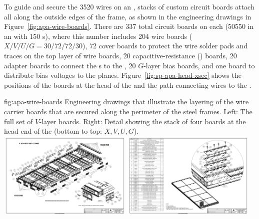 To guide and secure the \num{3520} wires on an , stacks of custom \frfour circuit boards attach all along the outside edges of the frame, as shown in the engineering drawings in Figure~\ref{fig:apa-wire-boards}.  There are \num{337} total circuit boards on each  (\num{50550} in an  with \num{150} s), where this number includes 204 wire boards ($X/V/U/G = 30/72/72/30$), 72 cover boards to protect the wire solder pads and traces on the top layer of wire boards, 20 capacitive-resistance () boards, 20 adapter boards to connect the s to the , 20 $G$-layer bias boards, and one  board to distribute bias voltages to the planes.  Figure~\ref{fig:sp-apa-head-xsec} shows the positions of the boards at the head of the  and the path connecting  wires to the .  %

\begin{dunefigure}{fig:apa-wire-boards}
{Engineering drawings that illustrate the layering of the wire carrier boards that are secured along the perimeter of the  steel frames. Left: The full set of $V$-layer boards.  Right: Detail showing the stack of four boards at the head end of the  (bottom to top: $X,V,U,G$).}
\includegraphics[width=0.48\textwidth,trim = 12mm 0mm 5mm 0mm,clip]{graphics/sp-apa-drawing-v-boards-exploded.jpg}
\includegraphics[width=0.48\textwidth,trim = 12mm 0mm 5mm 0mm,clip]{graphics/sp-apa-drawing-board-stack-detail.jpg}
\end{dunefigure}


